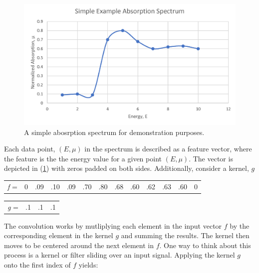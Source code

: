 \begin{figure}[h!]
    \centering
    \includegraphics[width=.75\linewidth]{Chapters/Figures/conv-example.png}
    \caption[Toy Absorption Spectrum]{A simple abosrption spectrum for demonstration purposes.}
    \label{fig:conv-ex-spectrum}
\end{figure}
 
\noindent Each data point, $ (E, \mu) $ in the spectrum is described as a feature vector, where the feature is the the energy value for a given point $ (E, \mu) $. The vector is depicted in (\ref{conv-squares}) with zeros padded on both sides. Additionally, consider a kernel, $ g $  

\begin{table}[h!]
    \centering
    \begin{tabular}{c|c|c|c|c|c|c|c|c|c|c|c|c|}
    \cline{2-13}
    \textit{f} = & 0 & .09 & .10 & .09 & .70 & .80 & .68 & .60 & .62 & .63 & .60 & 0 \\ \cline{2-13}
    \end{tabular}
    \label{conv-squares}
\end{table}

\begin{table}[h!]
\centering
    \begin{tabular}{lccc}
    \cline{2-4}
    \multicolumn{1}{l|}{\textit{g} =} & \multicolumn{1}{c|}{.1} & \multicolumn{1}{c|}{.1} & \multicolumn{1}{c|}{.1} \\ \cline{2-4}                 
    \end{tabular}
\end{table}

\noindent The convolution works by mutliplying each element in the input vector $ f $ by the corresponding element in the kernel $ g $ and summing the results. The kernel then moves to be centered around the next element in $ f $. One way to think about this process is a kernel or filter sliding over an input signal. Applying the kernel $ g $ onto the first index of $ f $ yields: 

